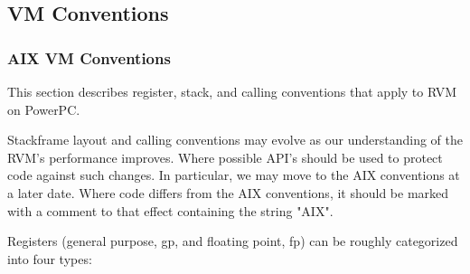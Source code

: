 \subsection{VM Conventions}
\subsubsection{AIX VM Conventions} \label{aix-conventions}

This section describes register, stack, and calling conventions that apply to 
RVM on PowerPC.

Stackframe layout and calling conventions may evolve as our understanding
of the RVM's performance improves.  Where possible API's should be used
to protect code against such changes.  In particular, we may move to
the AIX conventions at a later date.  Where code differs from the AIX
conventions, it should be marked with a comment to that effect containing
the string "AIX".


Registers (general purpose, gp, and floating point, fp) can be roughly
categorized into four types:

